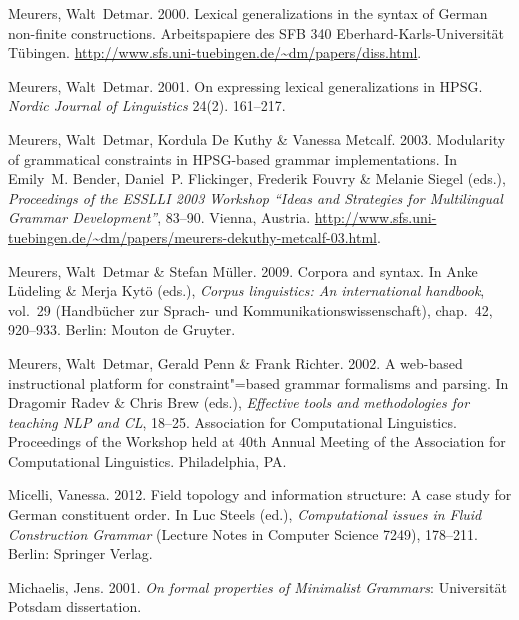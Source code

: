 \begin{thebibliography}{1420}
Meurers, Walt~Detmar. 2000.
\newblock Lexical generalizations in the syntax of {German} non-finite
  constructions.
\newblock Arbeitspapiere des SFB 340 
  Eberhard-Karls-Uni\-ver\-si\-t{\"a}t T{\"u}bingen.
\newblock \urlprefix\url{http://www.sfs.uni-tuebingen.de/~dm/papers/diss.html}.

Meurers, Walt~Detmar. 2001.
\newblock On expressing lexical generalizations in {HPSG}.
\newblock \emph{Nordic Journal of Linguistics} 24(2). 161--217.

Meurers, Walt~Detmar, Kordula {De Kuthy} \& Vanessa Metcalf. 2003.
\newblock Modularity of grammatical constraints in {HPSG}-based grammar
  implementations.
\newblock In Emily~M. Bender, Daniel~P. Flickinger, Frederik Fouvry \& Melanie
  Siegel (eds.), \emph{Proceedings of the {ESSLLI 2003 Workshop ``Ideas and
  Strategies for Multilingual Grammar Development''}}, 83--90. Vienna, Austria.
\newblock
  \urlprefix\url{http://www.sfs.uni-tuebingen.de/~dm/papers/meurers-dekuthy-metcalf-03.html}.

Meurers, Walt~Detmar \& Stefan M{\"u}ller. 2009.
\newblock Corpora and syntax.
\newblock In Anke L{\"u}deling \& Merja Kyt{\"o} (eds.), \emph{Corpus
  linguistics: {An} international handbook}, vol.~29  (Hand\-b{\"u}\-cher zur
  Sprach- und Kommunikationswissenschaft), chap.~42, 920--933. Berlin: Mouton
  de Gruyter.

Meurers, Walt~Detmar, Gerald Penn \& Frank Richter. 2002.
\newblock A web-based instructional platform for constraint"=based grammar
  formalisms and parsing.
\newblock In Dragomir Radev \& Chris Brew (eds.), \emph{Effective tools and
  methodologies for teaching {NLP} and {CL}}, 18--25. Association for
  Computational Linguistics.
\newblock Proceedings of the Workshop held at 40th Annual Meeting of the
  Association for Computational Linguistics. Philadelphia, PA.

Micelli, Vanessa. 2012.
\newblock Field topology and information structure: {A} case study for {German}
  constituent order.
\newblock In Luc Steels (ed.), \emph{Computational issues in {Fluid
  Construction Grammar}} (Lecture Notes in Computer Science 7249), 178--211.
  Berlin: Springer Verlag.

Michaelis, Jens. 2001.
\newblock \emph{On formal properties of {Minimalist Grammars}}: Universit{\"a}t
  Potsdam dissertation.


\end{thebibliography}
